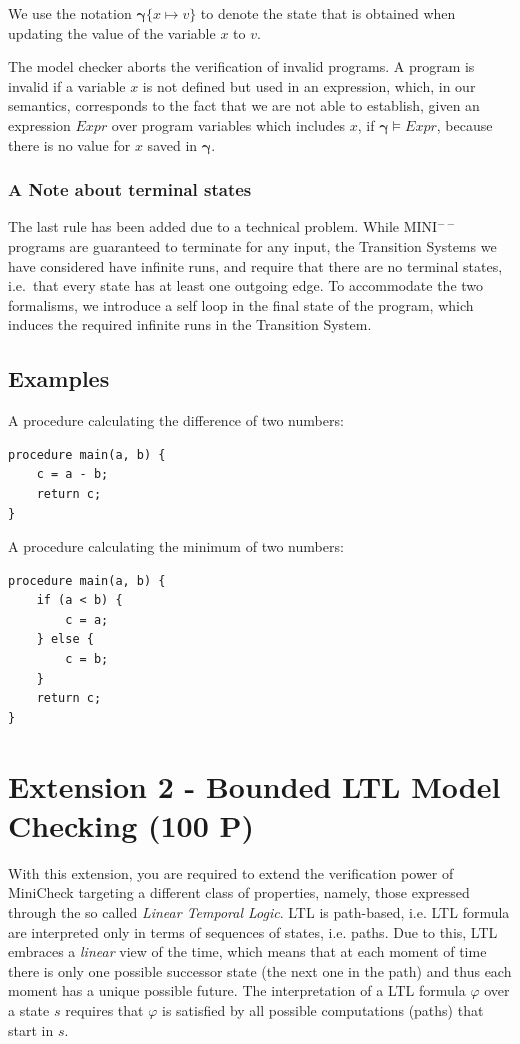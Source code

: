\documentclass{article}
\begin{document}
We use the notation $\mathbf{\gamma}\{x \mapsto v\}$ to denote the state that is obtained when updating the value of the variable $x$ to $v$. 

The model checker aborts the verification of invalid programs. A program is invalid if a variable $x$ is not defined but used in an expression, which, in our semantics, corresponds to the fact that we are not able to establish, given an expression $Expr$ over program variables which includes $x$, if $\mathbf{\gamma} \vDash Expr$, because there is no value for $x$ saved in $\mathbf{\gamma}$.

\subsubsection*{A Note about terminal states}
The last rule has been added due to a technical problem. 
While MINI$^{--}$ programs are guaranteed to terminate for any input, 
the Transition Systems we have considered have infinite runs, 
and require that there are no terminal states, i.e.~that every state has at least one outgoing edge. 
To accommodate the two formalisms, we introduce a self loop in the final state of the program, 
which induces the required infinite runs in the Transition System.

\subsection{Examples}
A procedure calculating the difference of two numbers:
\begin{lstlisting}
procedure main(a, b) {
    c = a - b;
    return c;
}
\end{lstlisting}

A procedure calculating the minimum of two numbers:
\begin{lstlisting}
procedure main(a, b) {
    if (a < b) {
        c = a;
    } else {
        c = b;
    }
    return c;
}
\end{lstlisting}


\section{Extension 2 - Bounded LTL Model Checking (100 P)}
\label{sec:ext2}
With this extension, you are required to extend the verification power of MiniCheck targeting a different class of properties, 
namely, those expressed through the so called \emph{Linear Temporal Logic}. 
LTL is path-based, i.e. LTL formula are interpreted only in terms of sequences of states, i.e. paths. 
Due to this, LTL embraces a \emph{linear} view of the time, 
which means that at each moment of time there is only one possible successor state (the next one in the path) 
and thus each moment has a unique possible future. 
The interpretation of a LTL formula $\varphi$ over a state $s$ requires that $\varphi$ is satisfied by all possible computations (paths) that start in $s$.
\end{document}
